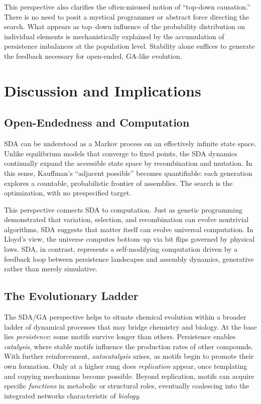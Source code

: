 \documentclass[life,article,submit,pdftex,moreauthors]{Definitions/mdpi}
\begin{document}
This perspective also clarifies the often-misused notion of “top-down causation.” There is no need to posit a mystical programmer or abstract force directing the search. What appears as top–down influence of the probability distribution on individual elements is mechanistically explained by the accumulation of persistence imbalances at the population level. Stability alone suffices to generate the feedback necessary for open-ended, GA-like evolution.



\section{Discussion and Implications}

\subsection{Open-Endedness and Computation}
SDA can be understood as a Markov process on an effectively infinite state space. 
Unlike equilibrium models that converge to fixed points, the SDA dynamics continually 
expand the accessible state space by recombination and mutation. In this sense, 
Kauffman’s “adjacent possible” becomes quantifiable: each generation explores a 
countable, probabilistic frontier of assemblies. The search is the optimization, 
with no prespecified target.  

This perspective connects SDA to computation. Just as genetic programming 
demonstrated that variation, selection, and recombination can evolve nontrivial 
algorithms, SDA suggests that matter itself can evolve universal computation. 
In Lloyd’s view, the universe computes bottom–up via bit flips governed by 
physical laws. SDA, in contrast, represents a self-modifying computation driven 
by a feedback loop between persistence landscapes and assembly dynamics, 
generative rather than merely simulative.  

\subsection{The Evolutionary Ladder}  
The SDA/GA perspective helps to situate chemical evolution within a broader ladder of dynamical processes that may bridge chemistry and biology. At the base lies \textit{persistence}: some motifs survive longer than others. Persistence enables \textit{catalysis}, where stable motifs influence the production rates of other compounds. With further reinforcement, \textit{autocatalysis} arises, as motifs begin to promote their own formation. Only at a higher rung does \textit{replication} appear, once templating and copying mechanisms become possible. Beyond replication, motifs can acquire specific \textit{functions} in metabolic or structural roles, eventually coalescing into the integrated networks characteristic of \textit{biology}.  
\end{document}

